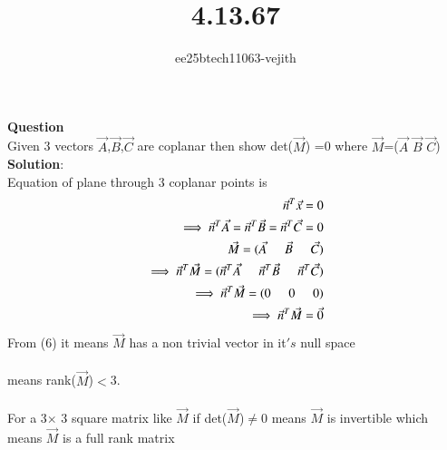 \documentclass[journal]{IEEEtran}
\begin{document}

\vspace{3cm}

\title{4.13.67}
\author{ee25btech11063-vejith}

\maketitle
{\let\newpage\relax\maketitle}
\renewcommand{\thefigure}{\theenumi}
\renewcommand{\thetable}{\theenumi}
\setlength{\intextsep}{10pt} %
\textbf{Question}\\
Given 3 vectors $\Vec{A}$,$\Vec{B}$,$\Vec{C}$ are coplanar then show det($\Vec{M}$) =0 where $\Vec{M}$=($\Vec{A}$  $\Vec{B}$  $\Vec{C}$)\\
\textbf{Solution}:\\
Equation of plane through 3 coplanar points is 
\begin{align}
    \Vec{n}^T\Vec{x}=0\\
    \implies \Vec{n}^T\Vec{A}= \Vec{n}^T\Vec{B} = \Vec{n}^T\Vec{C}=0\\
    \Vec{M}=(\Vec{A} \hspace{0.5cm} \Vec{B} \hspace{0.5cm} \Vec{C})\\
    \implies \Vec{n}^T\Vec{M}=(\Vec{n}^T\Vec{A} \hspace{0.5cm}  \Vec{n}^T\Vec{B} \hspace{0.5cm} \Vec{n}^T\Vec{C})\\
    \implies \Vec{n}^T\Vec{M}=(0\hspace{0.5cm} 0 \hspace{0.5cm} 0)\\
    \implies \Vec{n}^T\Vec{M}=\Vec{0}
    \end{align}
From (6) it means $\Vec{M}$ has a non trivial vector in it$'s$ null space\\ \\
means rank($\Vec{M}$)$<$3.\\ \\
For a 3$\times$ 3  square matrix like $\Vec{M}$ if det($\Vec{M}$)$\neq$0 means $\Vec{M}$ is invertible which means $\Vec{M}$ is a full rank matrix\\ 
\end{document}
